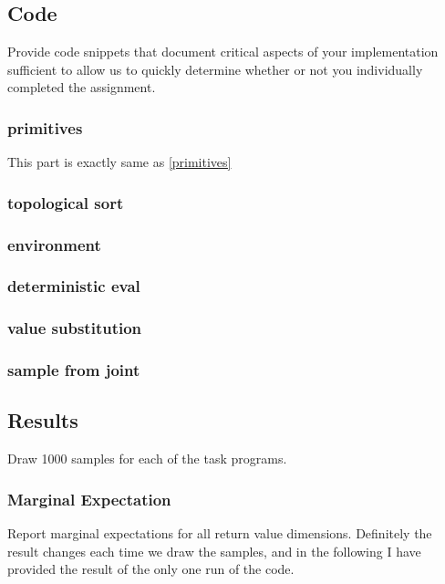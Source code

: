 \documentclass{article}
\def\blu#1{{\color{blu}#1}}
\begin{document}
\subsection{Code}
\blu{Provide code snippets that document critical aspects of your implementation sufficient to allow us to quickly determine whether or not you individually completed the assignment.}
\subsubsection{primitives}
This part is exactly same as \ref{primitives}
\subsubsection{topological sort}

\subsubsection{environment}

\subsubsection{deterministic eval}

\subsubsection{value substitution}

\subsubsection{sample from joint}


\subsection{Results}
\blu{Draw 1000 samples for each of the task programs.}
\subsubsection{Marginal Expectation}
\blu{Report marginal expectations for all return value dimensions.}
Definitely  the result changes each time we draw the samples, and in the following I have provided the result of the only one run of the code.
\end{document}
